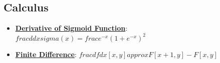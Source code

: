 \documentclass{article}%
\begin{document}
%
\subsection{Calculus}%
\label{subsec:Calculus}%
\begin{itemize}[leftmargin=*]%
\item \href{https://purdue.brightspace.com/d2l/common/assets/pdfjs-d2l-dist/1.0.14-legacy/web/viewer.html?file=\%2Fcontent\%2Fenforced\%2F1095467-wl.202510.CS.24300.001\%2F04L1-Linear Algebra Primer.pdf\%3Fou\%3D1095467\&lang=en-us\&container=d2l-fileviewer-rendered-pdf\&fullscreen=d2l-fileviewer-rendered-pdf-dialog\&height=667#page=21}{\textbf{Derivative of Sigmoid Function}}: $frac{d}{dx} sigma(x) = frac{e^{-x}}{(1 + e^{-x})^2}$%
\item \href{https://purdue.brightspace.com/d2l/common/assets/pdfjs-d2l-dist/1.0.14-legacy/web/viewer.html?file=\%2Fcontent\%2Fenforced\%2F1095467-wl.202510.CS.24300.001\%2F08L2-Feature Extraction.pdf\%3Fou\%3D1095467\&lang=en-us\&container=d2l-fileviewer-rendered-pdf\&fullscreen=d2l-fileviewer-rendered-pdf-dialog\&height=667#page=15}{\textbf{Finite Difference}}: $frac{df}{dx} [x, y] approx F[x + 1, y] - F[x, y]$%
\end{itemize}

%
\end{document}
